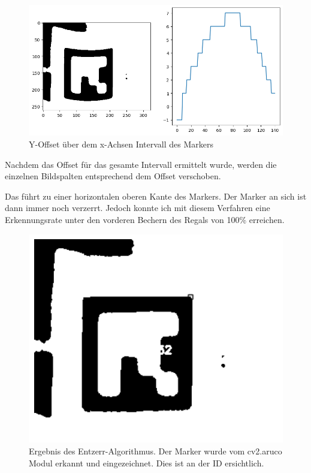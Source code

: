     \begin{figure}
        \caption[Entzerralgorithmus: y-Offset]{Y-Offset über dem x-Achsen Intervall des Markers}\label{fig:figure29}
        \includegraphics[width = \textwidth]{Bilder/calcOffset.png}
        \centering
    \end{figure}
    Nachdem das Offset für das gesamte Intervall ermittelt wurde, werden die einzelnen Bildspalten entsprechend dem Offset verschoben.

    Das führt zu einer horizontalen oberen Kante des Markers. Der Marker an sich ist dann immer noch verzerrt.
    Jedoch konnte ich mit diesem Verfahren eine Erkennungsrate unter den vorderen Bechern des Regals von 100\% erreichen.

    \begin{figure}
        \caption[Entzerralgorithmus: Ergebnis]{Ergebnis des Entzerr-Algorithmus. Der Marker wurde vom cv2.aruco Modul erkannt und eingezeichnet. Dies ist an der ID ersichtlich.}\label{fig:figure30}
        \includegraphics[width = \textwidth]{Bilder/undistortedCup.png}
        \centering
    \end{figure}
    \clearpage

